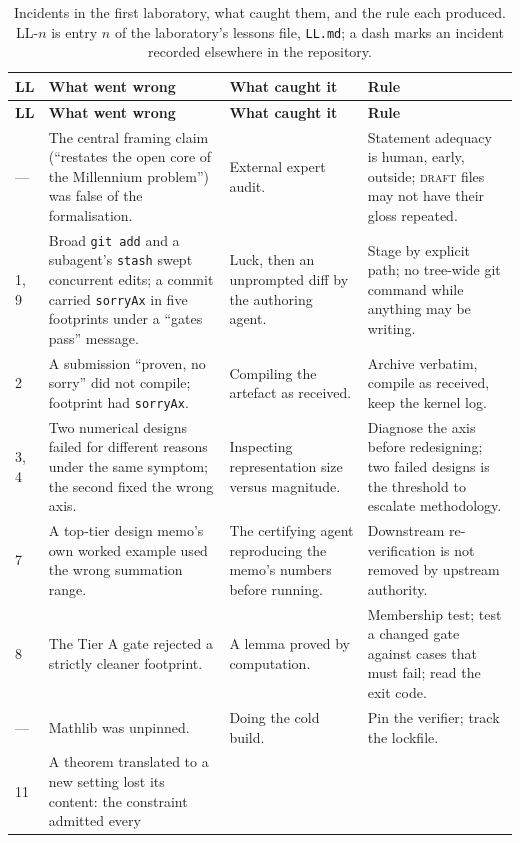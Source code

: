 \documentclass[11pt]{article}
\begin{document}
\begin{center}
\small
\begin{longtable}{@{}p{0.9cm}p{5.4cm}p{3.6cm}p{5.1cm}@{}}
\caption{Incidents in the first laboratory, what caught them, and the rule each produced.
LL-$n$ is entry $n$ of the laboratory's lessons file, \texttt{LL.md}; a dash marks an
incident recorded elsewhere in the repository.}\label{tab:incidents}\\
\toprule
\textbf{LL} & \textbf{What went wrong} & \textbf{What caught it} & \textbf{Rule} \\
\midrule
\endfirsthead
\toprule
\textbf{LL} & \textbf{What went wrong} & \textbf{What caught it} & \textbf{Rule} \\
\midrule
\endhead
--- & The central framing claim (``restates the open core of the Millennium problem'') was
false of the formalisation. & External expert audit. & Statement adequacy is human, early,
outside; \textsc{draft} files may not have their gloss repeated. \\
1, 9 & Broad \texttt{git add} and a subagent's \texttt{stash} swept concurrent edits; a commit
carried \texttt{sorryAx} in five footprints under a ``gates pass'' message. & Luck, then an
unprompted diff by the authoring agent. & Stage by explicit path; no tree-wide git command
while anything may be writing. \\
2 & A submission ``proven, no sorry'' did not compile; footprint had \texttt{sorryAx}. &
Compiling the artefact as received. & Archive verbatim, compile as received, keep the kernel
log. \\
3, 4 & Two numerical designs failed for different reasons under the same symptom; the second
fixed the wrong axis. & Inspecting representation size versus magnitude. & Diagnose the axis
before redesigning; two failed designs is the threshold to escalate methodology. \\
7 & A top-tier design memo's own worked example used the wrong summation range. & The
certifying agent reproducing the memo's numbers before running. & Downstream re-verification
is not removed by upstream authority. \\
8 & The Tier A gate rejected a strictly cleaner footprint. & A lemma proved by computation. &
Membership test; test a changed gate against cases that must fail; read the exit code. \\
--- & Mathlib was unpinned. & Doing the cold build. & Pin the verifier; track the lockfile. \\
11 & A theorem translated to a new setting lost its content: the constraint admitted every

\end{longtable}
\end{center}
\end{document}
